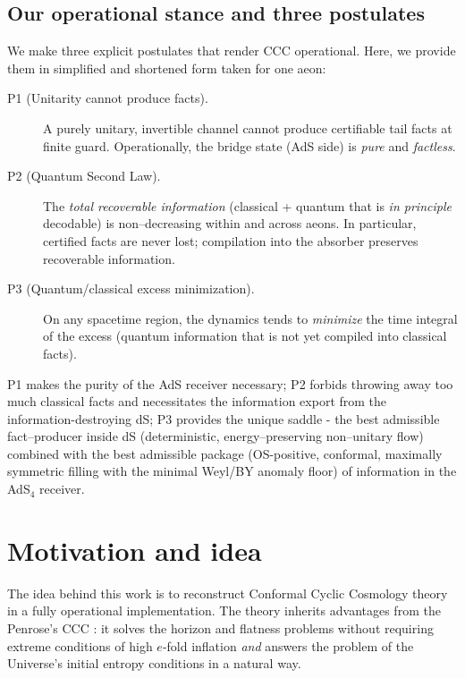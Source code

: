 \documentclass[10pt]{article}
\theoremstyle{definition}
\theoremstyle{plain}
\begin{document}
\subsection{Our operational stance and three postulates}
\label{subsec:intro-postulates}

We make three explicit postulates that render CCC operational. Here, we provide them in simplified and shortened form taken for one aeon:

\begin{description}
  \item[P1 (Unitarity cannot produce facts).] A purely unitary, invertible channel cannot produce certifiable tail facts at finite guard. Operationally, the bridge state (AdS side) is \emph{pure} and \emph{factless}.

  \item[P2 (Quantum Second Law).] The \emph{total recoverable information} (classical + quantum that is \emph{in principle} decodable) is non–decreasing within and across aeons. In particular, certified facts are never lost; compilation into the absorber preserves recoverable information.

  \item[P3 (Quantum/classical excess minimization).] On any spacetime region, the dynamics tends to \emph{minimize} the time integral of the excess (quantum information that is not yet compiled into classical facts). 
\end{description}

P1 makes the purity of the AdS receiver necessary; P2 forbids throwing away too much classical facts and necessitates the information export from the information-destroying dS; P3 provides the unique saddle - the best admissible fact–producer inside dS (deterministic, energy–preserving non–unitary flow) combined with the best admissible package (OS-positive, conformal, maximally symmetric filling with the minimal Weyl/BY anomaly floor) of information in the AdS$_4$ receiver.


\section{Motivation and idea}\label{sec:uom-main-001}
The idea behind this work is to reconstruct Conformal Cyclic Cosmology theory \cite{Penrose2010Cycles} in a fully operational implementation. The theory inherits advantages from the Penrose's CCC \cite{Penrose2010Cycles}: it solves the horizon and flatness problems without requiring extreme conditions of high $e$-fold inflation \emph{and} answers the problem of the Universe's initial entropy conditions in a natural way.
\end{document}
